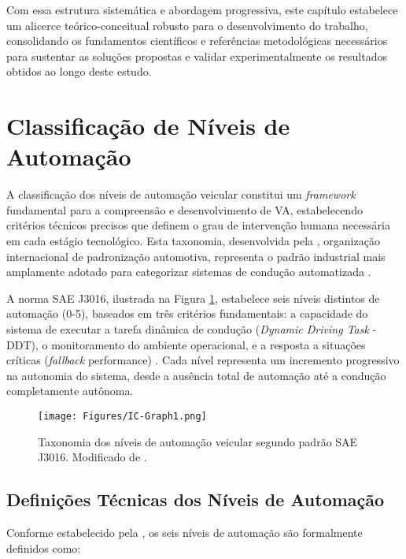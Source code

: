 Com essa estrutura sistemática e abordagem progressiva, este capítulo estabelece um alicerce teórico-conceitual robusto para o desenvolvimento do trabalho, consolidando os fundamentos científicos e referências metodológicas necessários para sustentar as soluções propostas e validar experimentalmente os resultados obtidos ao longo deste estudo.

\section{Classificação de Níveis de Automação} \label{levelcla}

A classificação dos níveis de automação veicular constitui um \textit{framework} fundamental para a compreensão e desenvolvimento de VA, estabelecendo critérios técnicos precisos que definem o grau de intervenção humana necessária em cada estágio tecnológico. Esta taxonomia, desenvolvida pela , organização internacional de padronização automotiva, representa o padrão industrial mais amplamente adotado para categorizar sistemas de condução automatizada \cite[p.~30]{SAE}.

A norma SAE J3016, ilustrada na Figura \ref{Graph_PT}, estabelece seis níveis distintos de automação (0-5), baseados em três critérios fundamentais: a capacidade do sistema de executar a tarefa dinâmica de condução (\textit{Dynamic Driving Task} - DDT), o monitoramento do ambiente operacional, e a resposta a situações críticas (\textit{fallback} performance) \cite[p.~28]{SAE}. Cada nível representa um incremento progressivo na autonomia do sistema, desde a ausência total de automação até a condução completamente autônoma.

\begin{figure}[H]
\centering
\texttt{[image: Figures/IC-Graph1.png]}
\caption{Taxonomia dos níveis de automação veicular segundo padrão SAE J3016. Modificado de \cite{SAE}.}
\label{Graph_PT}
\end{figure}

\subsection{Definições Técnicas dos Níveis de Automação}

Conforme estabelecido pela , os seis níveis de automação são formalmente definidos como:

